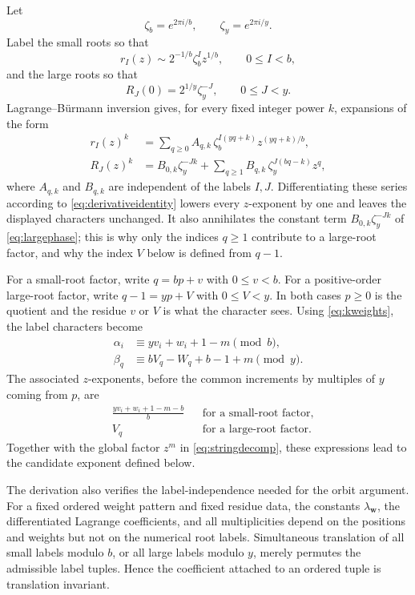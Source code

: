 \documentclass[11pt]{amsart}
\theoremstyle{remark}
\begin{document}
Let
\[
    \zeta_b=e^{2\pi i/b},
    \qquad
    \zeta_y=e^{2\pi i/y}.
\]
Label the small roots so that
\[
    r_I(z)\sim 2^{-1/b}\zeta_b^I z^{1/b},
    \qquad 0\le I<b,
\]
and the large roots so that
\[
    R_J(0)=2^{1/y}\zeta_y^{-J},
    \qquad 0\le J<y.
\]
Lagrange--B\"urmann inversion gives, for every fixed integer power $k$, expansions of the form
\begin{align}
 r_I(z)^k
 &=\sum_{q\ge0}A_{q,k}\,
   \zeta_b^{I(yq+k)}z^{(yq+k)/b},
 \label{eq:smallphase}\\
 R_J(z)^k
 &=B_{0,k}\zeta_y^{-Jk}
   +\sum_{q\ge1}B_{q,k}\,
   \zeta_y^{J(bq-k)}z^q,
 \label{eq:largephase}
\end{align}
where $A_{q,k}$ and $B_{q,k}$ are independent of the labels $I,J$.  Differentiating these series according to \eqref{eq:derivativeidentity} lowers every $z$-exponent by one and leaves the displayed characters unchanged.  It also annihilates the constant term $B_{0,k}\zeta_y^{-Jk}$ of \eqref{eq:largephase}; this is why only the indices $q\ge1$ contribute to a large-root factor, and why the index $V$ below is defined from $q-1$.

For a small-root factor, write $q=bp+v$ with $0\le v<b$.  For a positive-order large-root factor, write $q-1=yp+V$ with $0\le V<y$.  In both cases $p\ge0$ is the quotient and the residue $v$ or $V$ is what the character sees.  Using \eqref{eq:kweights}, the label characters become
\begin{align}
 \alpha_i&\equiv yv_i+w_i+1-m\pmod b,
 \label{eq:alpha}\\
 \beta_q&\equiv bV_q-W_q+b-1+m\pmod y.
 \label{eq:beta}
\end{align}
The associated $z$-exponents, before the common increments by multiples of $y$ coming from $p$, are
\begin{align}
 &\frac{yv_i+w_i+1-m-b}{b}
 &&\text{for a small-root factor},\label{eq:smallexponentpiece}\\
 &V_q
 &&\text{for a large-root factor}.\label{eq:largeexponentpiece}
\end{align}
Together with the global factor $z^m$ in \eqref{eq:stringdecomp}, these expressions lead to the candidate exponent defined below.

The derivation also verifies the label-independence needed for the orbit argument.  For a fixed ordered weight pattern and fixed residue data, the constants $\lambda_{\mathbf w}$, the differentiated Lagrange coefficients, and all multiplicities depend on the positions and weights but not on the numerical root labels.  Simultaneous translation of all small labels modulo $b$, or all large labels modulo $y$, merely permutes the admissible label tuples.  Hence the coefficient attached to an ordered tuple is translation invariant.
\end{document}
